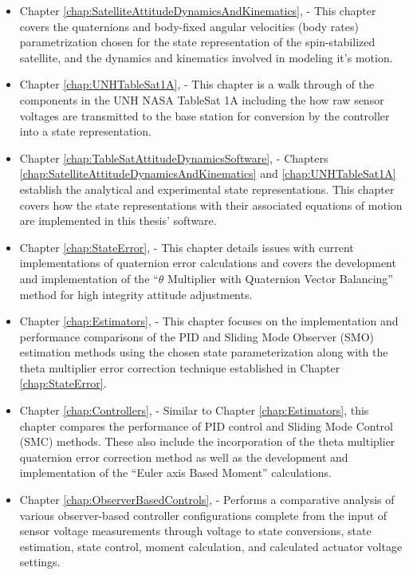 \begin{itemize}
\item Chapter \ref{chap:SatelliteAttitudeDynamicsAndKinematics},  - This chapter covers the quaternions and body-fixed angular velocities (body rates) parametrization chosen for the state representation of the spin-stabilized satellite, and the dynamics and kinematics involved in modeling it's motion.
\item Chapter \ref{chap:UNHTableSat1A},  - This chapter is a walk through of the components in the UNH NASA TableSat 1A including the how raw sensor voltages are transmitted to the base station for conversion by the controller into a state representation.
\item Chapter \ref{chap:TableSatAttitudeDynamicsSoftware},  - Chapters \ref{chap:SatelliteAttitudeDynamicsAndKinematics} and \ref{chap:UNHTableSat1A} establish the analytical and experimental state representations.  This chapter covers how the state representations with their associated equations of motion are implemented in this thesis' software.
\item Chapter \ref{chap:StateError},  - This chapter details issues with current implementations of quaternion error calculations and covers the development and implementation of the ``$\theta$ Multiplier with Quaternion Vector Balancing'' method for high integrity attitude adjustments.
\item Chapter \ref{chap:Estimators},  - This chapter focuses on the implementation and performance comparisons of the PID and Sliding Mode Observer (SMO) estimation methods using the chosen state parameterization along with the theta multiplier error correction technique established in Chapter \ref{chap:StateError}.
\item Chapter \ref{chap:Controllers},  - Similar to Chapter \ref{chap:Estimators}, this chapter compares the performance of PID control and Sliding Mode Control (SMC) methods.  These also include the incorporation of the theta multiplier quaternion error correction method as well as the development and implementation of the ``Euler axis Based Moment'' calculations.
\item Chapter \ref{chap:ObserverBasedControls},  - Performs a comparative analysis of various observer-based controller configurations complete from the input of sensor voltage measurements through voltage to state conversions, state estimation, state control, moment calculation, and calculated actuator voltage settings.

\end{itemize}
